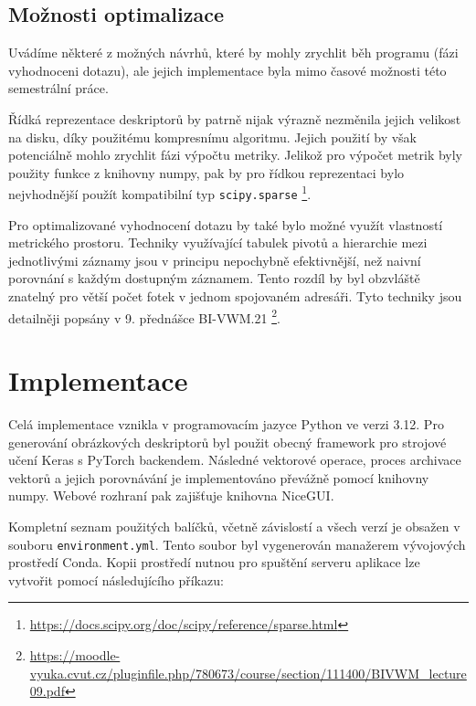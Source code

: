 \documentclass[12pt]{article}
\begin{document}
\subsection{Možnosti optimalizace}\label{sec:moznosti-optimalizace}

Uvádíme některé z možných návrhů, které by mohly zrychlit běh programu (fázi vyhodnoceni dotazu), ale jejich implementace byla mimo časové možnosti této semestrální práce.

Řídká reprezentace deskriptorů by patrně nijak výrazně nezměnila jejich velikost na disku, díky použitému kompresnímu algoritmu.
Jejich použití by však potenciálně mohlo zrychlit fázi výpočtu metriky.
Jelikož pro výpočet metrik byly použity funkce z knihovny numpy, pak by pro řídkou reprezentaci bylo nejvhodnější použít kompatibilní typ \texttt{scipy.sparse}%
\footnote{\url{https://docs.scipy.org/doc/scipy/reference/sparse.html}}.

Pro optimalizované vyhodnocení dotazu by také bylo možné využít vlastností metrického prostoru.
Techniky využívající tabulek pivotů a hierarchie mezi jednotlivými záznamy jsou v principu nepochybně efektivnější, než naivní porovnání s každým dostupným záznamem.
Tento rozdíl by byl obzvláště znatelný pro větší počet fotek v jednom spojovaném adresáři.
Tyto techniky jsou detailněji popsány v 9. přednášce BI-VWM.21%
\footnote{\url{https://moodle-vyuka.cvut.cz/pluginfile.php/780673/course/section/111400/BIVWM_lecture09.pdf}}.

\section{Implementace}


Celá implementace vznikla v programovacím jazyce Python ve verzi 3.12.
Pro generování obrázkových deskriptorů byl použit obecný framework pro strojové učení Keras s PyTorch backendem.
Následné vektorové operace, proces archivace vektorů a jejich porovnávání je implementováno převážně pomocí knihovny numpy.
Webové rozhraní pak zajišťuje knihovna NiceGUI.

Kompletní seznam použitých balíčků, včetně závislostí a všech verzí je obsažen v souboru \texttt{environment.yml}.
Tento soubor byl vygenerován manažerem vývojových prostředí Conda.
Kopii prostředí nutnou pro spuštění serveru aplikace lze vytvořit pomocí následujícího příkazu:
\end{document}
